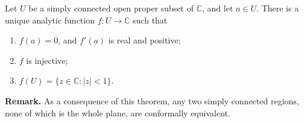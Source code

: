 \documentclass[12pt]{article}
\begin{document}
Let $U$ be a simply connected open proper subset of $\mathbb{C}$, and let
$a\in U$. There is a unique analytic function $f:U\rightarrow\mathbb{C}$
such that 
\begin{enumerate}
\item $f(a)=0$, and $f'(a)$ is real and positive;
\item $f$ is injective;
\item $f(U)=\{z\in \mathbb{C}:|z|<1\}$.
\end{enumerate}

\textbf{Remark.} As a consequence of this theorem, any two simply connected regions, none of which is the whole plane, are conformally equivalent.
\end{document}
